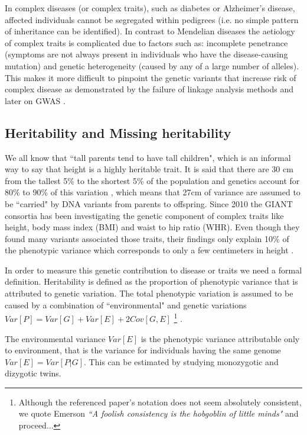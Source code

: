 In complex diseases (or complex traits), such as diabetes or Alzheimer's disease, affected individuals cannot be segregated within pedigrees (i.e. no simple pattern of inheritance can be identified). 
In contrast to Mendelian diseases the aetiology of complex traits is complicated due to factors such as: incomplete penetrance (symptoms are not always present in individuals who have the disease-causing mutation) and genetic heterogeneity (caused by any of a large number of alleles). 
This makes it more difficult to pinpoint the genetic variants that increase risk of complex disease as demonstrated by the failure of linkage analysis methods and later on GWAS \cite{botstein2003discovering}.

\subsection{Heritability and Missing heritability}

We all know that ``tall parents tend to have tall children", which is an informal way to say that height is a highly heritable trait. 
It is said that there are 30 cm from the tallest 5\% to the shortest 5\% of the population and genetics account for 80\% to 90\% of this variation \cite{wood2014defining}, which means that 27cm of variance are assumed to be ``carried" by DNA variants from parents to offspring. 
Since 2010 the GIANT consortia has been investigating the genetic component of complex traits like height, body mass index (BMI) and waist to hip ratio (WHR). Even though they found many variants associated those traits, their findings only explain 10\% of the phenotypic variance which corresponds to only a few centimeters in height \cite{wood2014defining}.

In order to measure this genetic contribution to disease or traits we need a formal definition. 
Heritability is defined as the proportion of phenotypic variance that is attributed to genetic variation. 
The total phenotypic variation is assumed to be caused by a combination of ``environmental" and genetic variations $Var[P] = Var[G] + Var[E] + 2 Cov[G, E]$ \cite{zuk2012mystery}
\iffinal
\footnote{Although the referenced paper's notation does not seem absolutely consistent, we quote Emerson \textit{``A foolish consistency is the hobgoblin of little minds"} and proceed...}
\fi
.

The environmental variance $Var[E]$ is the phenotypic variance attributable only to environment, that is the variance for individuals having the same genome $Var[E] = Var[P|G]$. This can be estimated by studying monozygotic and dizygotic twins.

